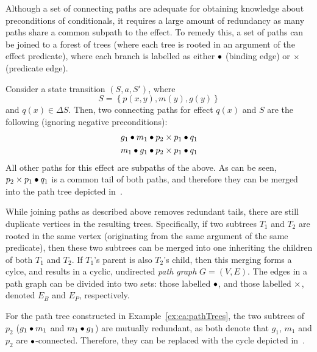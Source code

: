 \documentclass[../Master.tex]{subfiles}
\begin{document}
\providecommand{\master}{..}

Although a set of connecting paths are adequate for obtaining knowledge about preconditions of conditionals, it requires a large amount of redundancy as many paths share a common subpath to the effect. To remedy this, a set of paths can be joined to a forest of trees (where each tree is rooted in an argument of the effect predicate), where each branch is labelled as either $\bullet$ (binding edge) or $\times$ (predicate edge).

\begin{example}\label{ex:ca:pathTrees}
    Consider a state transition $\left( S, a, S' \right)$, where 
    \begin{equation*}
        S = \left\{ p(x, y), m(y), g(y) \right\}
    \end{equation*}
    and $q(x) \in \Delta S$. Then, two connecting paths for effect $q(x)$ and $S$ are the following (ignoring negative preconditions):
    \begin{align*}
        & g_1 \bullet m_1 \bullet p_2 \times p_1 \bullet q_1 \\
        & m_1 \bullet g_1 \bullet p_2 \times p_1 \bullet q_1
    \end{align*}
    All other paths for this effect are subpaths of the above. As can be seen, $p_2 \times p_1 \bullet q_1$ is a common tail of both paths, and therefore they can be merged into the path tree depicted in~.
\end{example}

While joining paths as described above removes redundant tails, there are still duplicate vertices in the resulting trees. Specifically, if two subtrees $T_1$ and $T_2$ are rooted in the same vertex (originating from the same argument of the same predicate), then these two subtrees can be merged into one inheriting the children of both $T_1$ and $T_2$. If $T_1$'s parent is also $T_2$'s child, then this merging forms a cylce, and results in a cyclic, undirected \emph{path graph} $G = (V, E)$. The edges in a path graph can be divided into two sets: those labelled $\bullet$, and those labelled $\times$, denoted $E_B$ and $E_P$, respectively.

\begin{example}\label{ex:ca:pathGraph}
    For the path tree constructed in Example~\ref{ex:ca:pathTrees}, the two subtrees of $p_2$ ($g_1 \bullet m_1$ and $m_1 \bullet g_1$) are mutually redundant, as both denote that $g_1$, $m_1$ and $p_2$ are $\bullet$-connected. Therefore, they can be replaced with the cycle depicted in~. 
\end{example}
\end{document}
